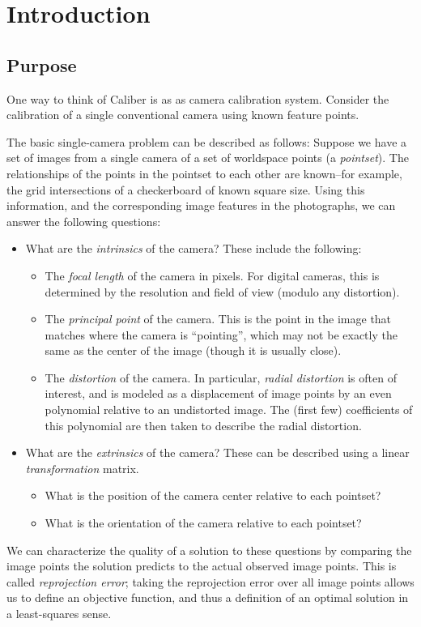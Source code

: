 \section{Introduction}
\subsection{Purpose}

One way to think of Caliber is as as camera calibration system. Consider the 
calibration of a single conventional camera using known feature points.

The basic single-camera problem can be described as follows: Suppose we have a set of images from 
a single camera of a set of worldspace points (a \textit{pointset}). The  
relationships of the points in the pointset to each other are known--for 
example, the grid intersections of a checkerboard of known square size. 
Using this information, and the corresponding image features in the photographs, 
we can answer the following 
questions:
\begin{itemize}
	\item What are the \textit{intrinsics} of the camera? These include the following:
		\begin{itemize}
			\item The \textit{focal length} of the camera in pixels. 
				For digital cameras, this is determined
				by the resolution and field of view (modulo any distortion).
			\item The \textit{principal point} of the camera. This is the point in the image
				that matches where the camera is ``pointing'', which may not be exactly the 
				same as the center of the image (though it is usually close).
			\item The \textit{distortion} of the camera. In particular, \textit{radial distortion}
				is often of interest, and is modeled as a displacement of image points
				by an even polynomial relative to an undistorted image. The (first few)
				coefficients of this polynomial are then taken to describe the radial distortion.
		\end{itemize}
	\item What are the \textit{extrinsics} of the camera? These can be described using a linear 
			\textit{transformation} matrix.
		\begin{itemize}
			\item What is the position of the camera center relative to each pointset?
			\item What is the orientation of the camera relative to each pointset?
		\end{itemize}
\end{itemize}
We can characterize the quality of a solution to these questions by comparing the image points 
the solution predicts to the actual observed image points. This is called \textit{reprojection error};
taking the reprojection error over all image points allows us to define an objective function, and
thus a definition of an optimal solution in a least-squares sense.

